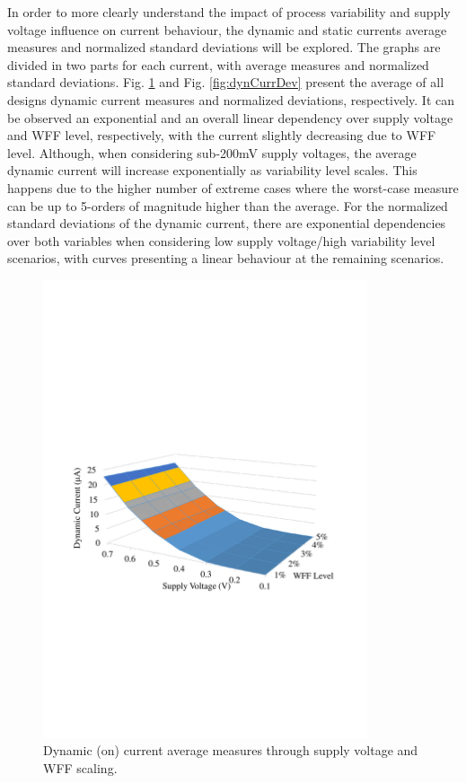 \documentclass[diss,pgmicro,english]{iiufrgs}
\begin{document}
In order to more clearly understand the impact of process variability and supply voltage influence on current behaviour, the dynamic and static currents average measures and normalized standard deviations will be explored. The graphs are divided in two parts for each current, with average measures and normalized standard deviations. Fig. \ref{fig:dynCurrAbs} and Fig. \ref{fig:dynCurrDev} present the average of all designs dynamic current measures and normalized deviations, respectively. It can be observed an exponential and an overall linear dependency over supply voltage and WFF level, respectively, with the current slightly decreasing due to WFF level. Although, when considering sub-200mV supply voltages, the average dynamic current will increase exponentially as variability level scales. This happens due to the higher number of extreme cases where the worst-case measure can be up to 5-orders of magnitude higher than the average. For the normalized standard deviations of the dynamic current, there are exponential dependencies over both variables when considering low supply voltage/high variability level scenarios, with curves presenting a linear behaviour at the remaining scenarios.



    \begin{figure}[t]
        \centering
            \includegraphics[width=0.85\textwidth, trim={1.25cm 9cm 2cm 11cm}, clip]{dynamicCurrAbs.pdf}
            \caption{Dynamic (on) current average measures through supply voltage and WFF scaling.}
        \label{fig:dynCurrAbs}
    \end{figure}
\end{document}
